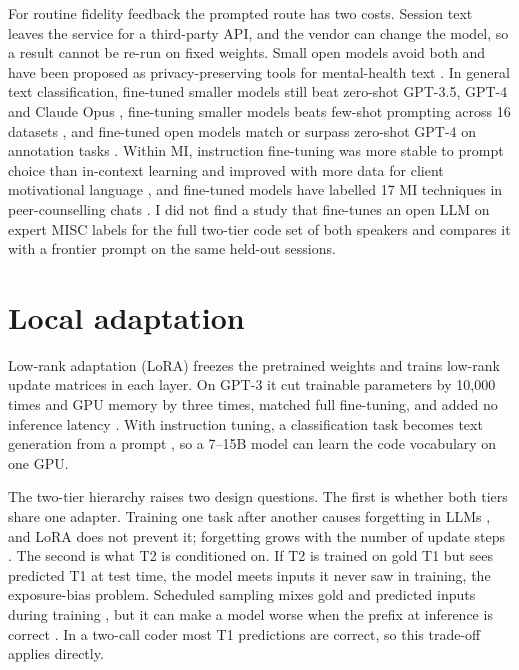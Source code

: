 For routine fidelity feedback the prompted route has two costs. Session text leaves the service for a third-party API, and the vendor can change the model, so a result cannot be re-run on fixed weights. Small open models avoid both and have been proposed as privacy-preserving tools for mental-health text \citep{jia2025beyond}. In general text classification, fine-tuned smaller models still beat zero-shot GPT-3.5, GPT-4 and Claude Opus \citep{bucher2024finetuned}, fine-tuning smaller models beats few-shot prompting across 16 datasets \citep{edwards2024language}, and fine-tuned open models match or surpass zero-shot GPT-4 on annotation tasks \citep{alizadeh2025opensource}. Within MI, instruction fine-tuning was more stable to prompt choice than in-context learning and improved with more data for client motivational language \citep{hoang2024client}, and fine-tuned models have labelled 17 MI techniques in peer-counselling chats \citep{shah2022modeling}. I did not find a study that fine-tunes an open LLM on expert MISC labels for the full two-tier code set of both speakers and compares it with a frontier prompt on the same held-out sessions.

\section{Local adaptation}
\label{sec:rw-peft}

Low-rank adaptation (LoRA) freezes the pretrained weights and trains low-rank update matrices in each layer. On GPT-3 it cut trainable parameters by 10,000 times and GPU memory by three times, matched full fine-tuning, and added no inference latency \citep{hu2022lora}. With instruction tuning, a classification task becomes text generation from a prompt \citep{wei2022finetuned}, so a 7--15B model can learn the code vocabulary on one GPU.

The two-tier hierarchy raises two design questions. The first is whether both tiers share one adapter. Training one task after another causes forgetting in LLMs \citep{luo2025empirical}, and LoRA does not prevent it; forgetting grows with the number of update steps \citep{kalajdzievski2024scaling}. The second is what T2 is conditioned on. If T2 is trained on gold T1 but sees predicted T1 at test time, the model meets inputs it never saw in training, the exposure-bias problem. Scheduled sampling mixes gold and predicted inputs during training \citep{bengio2015scheduled}, but it can make a model worse when the prefix at inference is correct \citep{korakakis2022improving}. In a two-call coder most T1 predictions are correct, so this trade-off applies directly.

